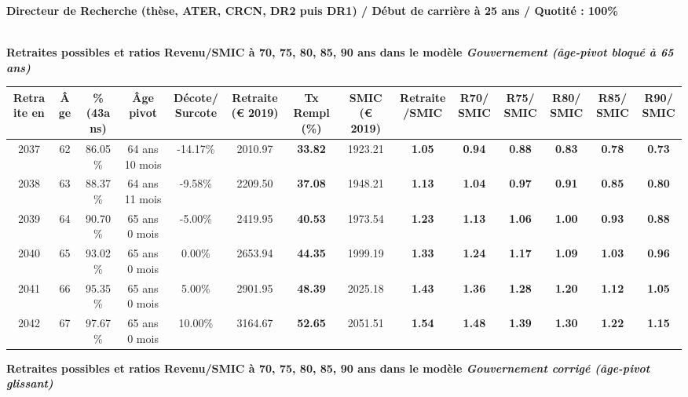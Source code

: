 {\bf \noindent Directeur de Recherche (thèse, ATER, CRCN, DR2 puis DR1) / Début de carrière à 25 ans / Quotité : 100\%}  ~ 

 ~\\{\bf \noindent Retraites possibles et ratios Revenu/SMIC à 70, 75, 80, 85, 90 ans dans le modèle \emph{Gouvernement (âge-pivot bloqué à 65 ans)}}  
 
\begin{adjustbox}{max width=\textwidth} 
\begin{tabular}[htb]{|c|c||c|c|c||c|c||c|c||c|c|c|c|c|} 
\hline 
 Retraite en &  Âge &  \%(43ans) &  Âge pivot &  Décote/Surcote &  Retraite (\euro{} 2019) &  Tx Rempl(\%) &  SMIC (\euro{} 2019) &  Retraite/SMIC &  R70/SMIC &  R75/SMIC &  R80/SMIC &  R85/SMIC &  R90/SMIC \\ 
\hline \hline 
 2037 &  62 &  86.05\% &  64 ans 10 mois &  -14.17\% &  2010.97 &  {\bf 33.82} &  1923.21 &  {\bf 1.05} &  {\bf {\color{red} 0.94}} &  {\bf {\color{red} 0.88}} &  {\bf {\color{red} 0.83}} &  {\bf {\color{red} 0.78}} &  {\bf {\color{red} 0.73}} \\ 
\hline 
 2038 &  63 &  88.37\% &  64 ans 11 mois &  -9.58\% &  2209.50 &  {\bf 37.08} &  1948.21 &  {\bf 1.13} &  {\bf 1.04} &  {\bf {\color{red} 0.97}} &  {\bf {\color{red} 0.91}} &  {\bf {\color{red} 0.85}} &  {\bf {\color{red} 0.80}} \\ 
\hline 
 2039 &  64 &  90.70\% &  65 ans 0 mois &  -5.00\% &  2419.95 &  {\bf 40.53} &  1973.54 &  {\bf 1.23} &  {\bf 1.13} &  {\bf 1.06} &  {\bf {\color{red} 1.00}} &  {\bf {\color{red} 0.93}} &  {\bf {\color{red} 0.88}} \\ 
\hline 
 2040 &  65 &  93.02\% &  65 ans 0 mois &  0.00\% &  2653.94 &  {\bf 44.35} &  1999.19 &  {\bf 1.33} &  {\bf 1.24} &  {\bf 1.17} &  {\bf 1.09} &  {\bf 1.03} &  {\bf {\color{red} 0.96}} \\ 
\hline 
 2041 &  66 &  95.35\% &  65 ans 0 mois &  5.00\% &  2901.95 &  {\bf 48.39} &  2025.18 &  {\bf 1.43} &  {\bf 1.36} &  {\bf 1.28} &  {\bf 1.20} &  {\bf 1.12} &  {\bf 1.05} \\ 
\hline 
 2042 &  67 &  97.67\% &  65 ans 0 mois &  10.00\% &  3164.67 &  {\bf 52.65} &  2051.51 &  {\bf 1.54} &  {\bf 1.48} &  {\bf 1.39} &  {\bf 1.30} &  {\bf 1.22} &  {\bf 1.15} \\ 
\hline 
\hline 
\end{tabular} 
\end{adjustbox} 
 
 \vspace{0.1cm} 
{\bf \noindent Retraites possibles et ratios Revenu/SMIC à 70, 75, 80, 85, 90 ans dans le modèle \emph{Gouvernement corrigé (âge-pivot glissant)}}  
 
